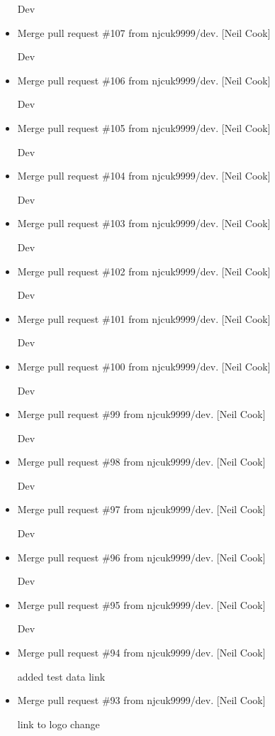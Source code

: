 \documentclass[a4paper,10pt,english]{report}
\begin{document}
\begin{itemize}
Dev

\item {} 
Merge pull request \#107 from njcuk9999/dev. {[}Neil Cook{]}

Dev

\item {} 
Merge pull request \#106 from njcuk9999/dev. {[}Neil Cook{]}

Dev

\item {} 
Merge pull request \#105 from njcuk9999/dev. {[}Neil Cook{]}

Dev

\item {} 
Merge pull request \#104 from njcuk9999/dev. {[}Neil Cook{]}

Dev

\item {} 
Merge pull request \#103 from njcuk9999/dev. {[}Neil Cook{]}

Dev

\item {} 
Merge pull request \#102 from njcuk9999/dev. {[}Neil Cook{]}

Dev

\item {} 
Merge pull request \#101 from njcuk9999/dev. {[}Neil Cook{]}

Dev

\item {} 
Merge pull request \#100 from njcuk9999/dev. {[}Neil Cook{]}

Dev

\item {} 
Merge pull request \#99 from njcuk9999/dev. {[}Neil Cook{]}

Dev

\item {} 
Merge pull request \#98 from njcuk9999/dev. {[}Neil Cook{]}

Dev

\item {} 
Merge pull request \#97 from njcuk9999/dev. {[}Neil Cook{]}

Dev

\item {} 
Merge pull request \#96 from njcuk9999/dev. {[}Neil Cook{]}

Dev

\item {} 
Merge pull request \#95 from njcuk9999/dev. {[}Neil Cook{]}

Dev

\item {} 
Merge pull request \#94 from njcuk9999/dev. {[}Neil Cook{]}

added test data link

\item {} 
Merge pull request \#93 from njcuk9999/dev. {[}Neil Cook{]}

link to logo change

\end{itemize}
\end{document}
